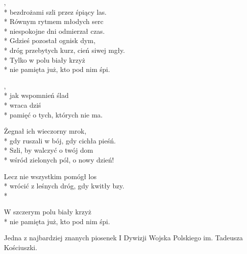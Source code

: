 \begin{lyrics}[longestline={dróg przebytych kurz, cień siwej mgły.}]

,\\*
bezdrożami szli przez śpiący las.\\*
Równym rytmem młodych serc\\*
niespokojne dni odmierzał czas.\\*
\smallskip
Gdzieś pozostał ognisk dym,\\*
dróg przebytych kurz, cień siwej mgły.\\*
Tylko w polu biały krzyż\\*
nie pamięta już, kto pod nim śpi.

\begin{chorus}
,\\*
jak wspomnień ślad\\*
wraca dziś\\*
pamięć o tych, których nie ma.
\end{chorus}

Żegnał ich wieczorny mrok,\\*
gdy ruszali w bój, gdy cichła pieśń.\\*
Szli, by walczyć o twój dom\\*
wśród zielonych pól, o nowy dzień!

\chorusref

Lecz nie wszystkim pomógł los\\*
wrócić z leśnych dróg, gdy kwitły bzy.\\*
\begin{markverses}%
W szczerym polu biały krzyż\\*
nie pamięta już, kto pod nim śpi.
\end{markverses}
\end{lyrics}


\begin{info}Jedna z najbardziej znanych piosenek I Dywizji Wojska Polskiego im. Tadeusza Kościuszki.\end{info}

